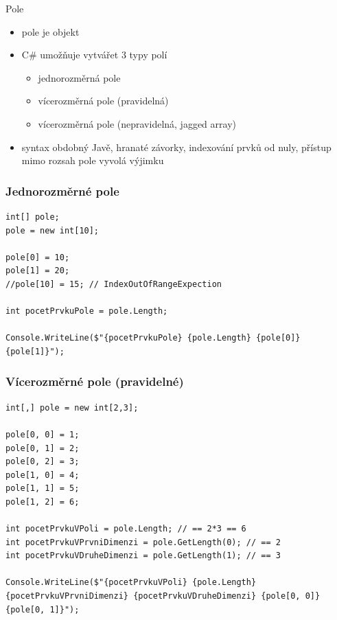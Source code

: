 \begin{frame}[fragile]
\begin{block}{Pole}
\begin{itemize}
\item pole je objekt
\item C\# umožňuje vytvářet 3 typy polí
\begin{itemize}
\item jednorozměrná pole
\item vícerozměrná pole (pravidelná)
\item vícerozměrná pole (nepravidelná, jagged array)
\end{itemize}

\item syntax obdobný Javě, hranaté závorky, indexování prvků od nuly, přístup mimo rozsah pole vyvolá výjimku
\end{itemize}
\end{block}
\end{frame}

\begin{frame}[fragile]
\frametitle{Jednorozměrné pole}
\begin{yesblock}
\begin{lstlisting}
int[] pole;
pole = new int[10];

pole[0] = 10;
pole[1] = 20;
//pole[10] = 15; // IndexOutOfRangeExpection

int pocetPrvkuPole = pole.Length;

Console.WriteLine($"{pocetPrvkuPole} {pole.Length} {pole[0]}{pole[1]}");
\end{lstlisting}
\end{yesblock}
\end{frame}



\begin{frame}[fragile]
\frametitle{Vícerozměrné pole (pravidelné)}
\begin{yesblock}
\begin{lstlisting}
int[,] pole = new int[2,3];

pole[0, 0] = 1;
pole[0, 1] = 2;
pole[0, 2] = 3;
pole[1, 0] = 4;
pole[1, 1] = 5;
pole[1, 2] = 6;

int pocetPrvkuVPoli = pole.Length; // == 2*3 == 6
int pocetPrvkuVPrvniDimenzi = pole.GetLength(0); // == 2
int pocetPrvkuVDruheDimenzi = pole.GetLength(1); // == 3

Console.WriteLine($"{pocetPrvkuVPoli} {pole.Length} {pocetPrvkuVPrvniDimenzi} {pocetPrvkuVDruheDimenzi} {pole[0, 0]} {pole[0, 1]}");
\end{lstlisting}
\end{yesblock}
\end{frame}


